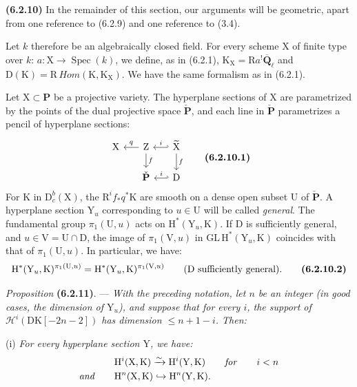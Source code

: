 \documentclass[11pt,leqno]{article}
\begin{document}
\textbf{(6.2.10)} In the remainder of this section, our arguments will be geometric, apart from one reference to (6.2.9) and one reference to (3.4).

Let \(k\) therefore be an algebraically closed field. For every scheme \(\mathrm{X}\) of finite type over \(k\): \(a:\mathrm{X}\to\operatorname{Spec}(k)\), we define, as in (6.2.1), \(\mathrm{K}_{\mathrm{X}}=\mathrm{R}a^!\overline{\mathbf{Q}}_{\ell}\) and \(\mathrm{D}(\mathrm{K})=\mathrm{R}\,\mathit{Hom}(\mathrm{K},\mathrm{K}_{\mathrm{X}})\). We have the same formalism as in (6.2.1).

Let \(\mathrm{X}\subset\mathbf{P}\) be a projective variety. The hyperplane sections of \(\mathrm{X}\) are parametrized by the points of the dual projective space \(\check{\mathbf{P}}\), and each line in \(\check{\mathbf{P}}\) parametrizes a pencil of hyperplane sections:
\[
\begin{tikzcd}[column sep=1.5em, row sep=1.5em]
\mathrm{X}
& \mathrm{Z} \arrow[l, "q"'] \arrow[d, "f"]
& \widetilde{\mathrm{X}} \arrow[l, hook', "i"'] \arrow[d, "f"] \\
& \check{\mathbf{P}}
& \mathrm{D} \arrow[l, hook', "i"']
\end{tikzcd}
\tag*{\textbf{(6.2.10.1)}}
\]
For \(\mathrm{K}\) in \(\mathrm{D}_c^b(\mathrm{X})\), the \(\mathrm{R}^if_*q^*\mathrm{K}\) are smooth on a dense open subset \(\mathrm{U}\) of \(\check{\mathbf{P}}\). A hyperplane section \(\mathrm{Y}_u\) corresponding to \(u\in\mathrm{U}\) will be called \textit{general}. The fundamental group \(\pi_1(\mathrm{U},u)\) acts on \(\mathrm{H}^*(\mathrm{Y}_u,\mathrm{K})\). If \(\mathrm{D}\) is sufficiently general, and \(u\in\mathrm{V}=\mathrm{U}\cap\mathrm{D}\), the image of \(\pi_1(\mathrm{V},u)\) in \(\mathrm{GL}\,\mathrm{H}^*(\mathrm{Y}_u,\mathrm{K})\) coincides with that of \(\pi_1(\mathrm{U},u)\). In particular, we have:
\[
\mathrm{H}^*(\mathrm{Y}_u,\mathrm{K})^{\pi_1(\mathrm{U},u)}
=
\mathrm{H}^*(\mathrm{Y}_u,\mathrm{K})^{\pi_1(\mathrm{V},u)}
\qquad
\text{(\(\mathrm{D}\) sufficiently general).}
\tag*{\textbf{(6.2.10.2)}}
\]

\medskip
\textit{Proposition} \textbf{(6.2.11)}. — \textit{With the preceding notation, let \(n\) be an integer (in good cases, the dimension of \(\mathrm{Y}_u\)), and suppose that for every \(i\), the support of \(\mathscr{H}^i(\mathrm{DK}[-2n-2])\) has dimension \(\leq n+1-i\). Then:}

(i) \textit{For every hyperplane section \(\mathrm{Y}\), we have:}
\begin{align*}
& \mathrm{H}^i(\mathrm{X},\mathrm{K})
  \xrightarrow{\sim}
  \mathrm{H}^i(\mathrm{Y},\mathrm{K})
  \qquad \text{\textit{for}} \qquad i<n \\
\text{\textit{and}}\qquad
& \mathrm{H}^n(\mathrm{X},\mathrm{K})
  \hookrightarrow
  \mathrm{H}^n(\mathrm{Y},\mathrm{K}).
\end{align*}
\end{document}

